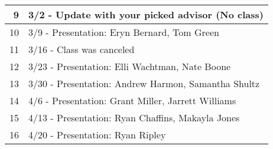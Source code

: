 \begin{tabularx}{\linewidth}{|r|X|}

9
&

3/2 - Update with your picked advisor (No class)
\\\hline


10
&

3/9 - Presentation: Eryn Bernard, Tom Green
\\\hline


11
&

3/16 - Class was canceled
\\\hline


12
&

3/23 - Presentation: Elli Wachtman, Nate Boone
\\\hline


13
&

3/30 - Presentation: Andrew Harmon, Samantha Shultz
\\\hline


14
&

4/6 - Presentation: Grant Miller, Jarrett Williams
\\\hline


15
&

4/13 - Presentation: Ryan Chaffins, Makayla Jones
\\\hline


16
&

4/20 - Presentation: Ryan Ripley
\\\hline

\end{tabularx}

